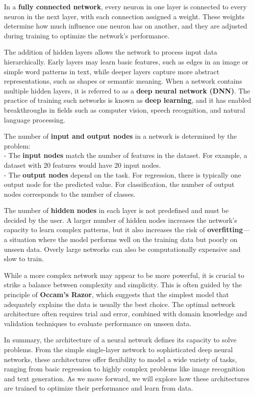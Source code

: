 \documentclass[
]{book}
\theoremstyle{definition}
\theoremstyle{definition}
\theoremstyle{definition}
\theoremstyle{definition}
\theoremstyle{remark}
\begin{document}
In a \textbf{fully connected network}, every neuron in one layer is connected to every neuron in the next layer, with each connection assigned a weight. These weights determine how much influence one neuron has on another, and they are adjusted during training to optimize the network's performance.

The addition of hidden layers allows the network to process input data hierarchically. Early layers may learn basic features, such as edges in an image or simple word patterns in text, while deeper layers capture more abstract representations, such as shapes or semantic meaning. When a network contains multiple hidden layers, it is referred to as a \textbf{deep neural network (DNN)}. The practice of training such networks is known as \textbf{deep learning}, and it has enabled breakthroughs in fields such as computer vision, speech recognition, and natural language processing.

The number of \textbf{input and output nodes} in a network is determined by the problem:\\
- The \textbf{input nodes} match the number of features in the dataset. For example, a dataset with 20 features would have 20 input nodes.\\
- The \textbf{output nodes} depend on the task. For regression, there is typically one output node for the predicted value. For classification, the number of output nodes corresponds to the number of classes.

The number of \textbf{hidden nodes} in each layer is not predefined and must be decided by the user. A larger number of hidden nodes increases the network's capacity to learn complex patterns, but it also increases the risk of \textbf{overfitting}---a situation where the model performs well on the training data but poorly on unseen data. Overly large networks can also be computationally expensive and slow to train.

While a more complex network may appear to be more powerful, it is crucial to strike a balance between complexity and simplicity. This is often guided by the principle of \textbf{Occam's Razor}, which suggests that the simplest model that adequately explains the data is usually the best choice. The optimal network architecture often requires trial and error, combined with domain knowledge and validation techniques to evaluate performance on unseen data.

In summary, the architecture of a neural network defines its capacity to solve problems. From the simple single-layer network to sophisticated deep neural networks, these architectures offer flexibility to model a wide variety of tasks, ranging from basic regression to highly complex problems like image recognition and text generation. As we move forward, we will explore how these architectures are trained to optimize their performance and learn from data.
\end{document}
